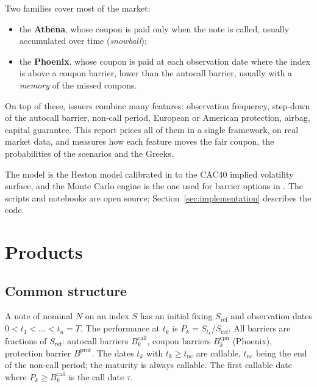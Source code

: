 \documentclass[11pt,a4paper]{article}
\newcommand{\Sref}{S_{\mathrm{ref}}}
\begin{document}
Two families cover most of the market:
\begin{itemize}
\item the \textbf{Athena}, whose coupon is paid only when the note is called, usually accumulated over time
(\emph{snowball});
\item the \textbf{Phoenix}, whose coupon is paid at each observation date where the index is above a coupon
barrier, lower than the autocall barrier, usually with a \emph{memory} of the missed coupons.
\end{itemize}
On top of these, issuers combine many features: observation frequency, step-down of the autocall barrier,
non-call period, European or American protection, airbag, capital guarantee. This report prices all of them in a
single framework, on real market data, and measures how each feature moves the fair coupon, the probabilities
of the scenarios and the Greeks.

The model is the Heston model calibrated in \cite{benguedda2026heston} to the CAC40 implied volatility surface,
and the Monte Carlo engine is the one used for barrier options in \cite{benguedda2026barrier}. The scripts and
notebooks are open source; Section~\ref{sec:implementation} describes the code.

\section{Products}\label{sec:products}

\subsection{Common structure}
A note of nominal $N$ on an index $S$ has an initial fixing $\Sref$ and observation dates
$0 < t_1 < \dots < t_n = T$. The performance at $t_k$ is $P_k = S_{t_k}/\Sref$. All barriers are fractions of
$\Sref$: autocall barriers $B^{\mathrm{call}}_k$, coupon barriers $B^{\mathrm{cpn}}_k$ (Phoenix), protection
barrier $B^{\mathrm{prot}}$. The dates $t_k$ with $t_k \ge t_{\mathrm{nc}}$ are callable, $t_{\mathrm{nc}}$ being the
end of the non-call period; the maturity is always callable. The first callable date where
$P_k \ge B^{\mathrm{call}}_k$ is the call date $\tau$.
\end{document}
